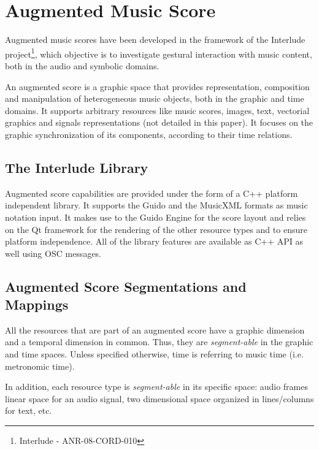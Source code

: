 \documentclass[twoside,10pt]{article}
\begin{document}
\section{Augmented Music Score}\label{sec:augmscore}

Augmented music scores have been developed in the framework of the Interlude project\footnote{Interlude - ANR-08-CORD-010}, which objective is to investigate gestural interaction with music content, both in the audio and symbolic domains.

An augmented score is a graphic space that provides representation, composition and manipulation of heterogeneous music objects, both in the graphic and time domains. It supports arbitrary resources like music scores, images, text, vectorial graphics and signals representations (not detailed in this paper). It focuses on the graphic synchronization of its components, according to their time relations.

\subsection{The Interlude Library}\label{sec:itl}

Augmented score capabilities are provided under the form of a C++ platform independent library. 
It supports the Guido \cite{hoos98} and the MusicXML formats \cite{good01} as music notation input. It makes use to the Guido Engine \cite{Fober:04b,RENZ02} for the score layout and relies on the Qt framework \cite{qt4} for the rendering of the other resource types and to ensure platform independence. All of the library features are available as C++ API as well using OSC \cite{OSC} messages.

\subsection{Augmented Score Segmentations and Mappings}\label{sec:asm}

All the resources that are part of an augmented score have a graphic dimension and a temporal dimension in common. Thus, they are \emph{segment-able} in the graphic and time spaces. Unless specified otherwise, time is referring to music time (i.e. metronomic time). 

In  addition, each resource type is \emph{segment-able} in its specific space: audio frames linear space for an audio signal, two dimensional space organized in lines/columns for text, etc.
\end{document}
